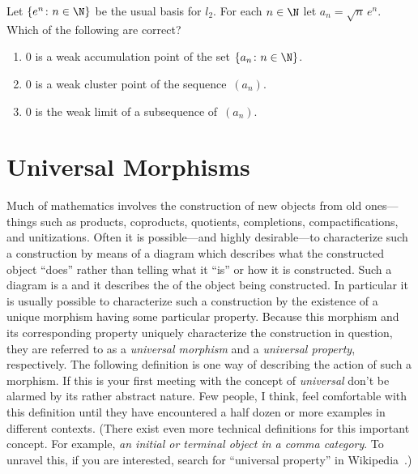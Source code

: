 \begin{exer} Let $\{e^n\colon n \in \N\}$ be the usual basis for $l_2$. For
each $n \in \N$ let $a_n = \sqrt n\, e^n$.  Which of the following
are correct?
 \begin{enumerate}
  \item $0$ is a weak accumulation point of the set
$\{a_n\colon n \in \N\}$.
  \item $0$ is a weak cluster point of the sequence~$(a_n)$.
  \item $0$ is the weak limit of a subsequence of~$(a_n)$.
 \end{enumerate}
\end{exer}










\section{Universal Morphisms}
Much of mathematics involves the construction of new objects from old ones---things such
as products, coproducts, quotients, completions, compactifications, and unitizations.
Often it is possible---and highly desirable---to characterize such a construction by
means of a diagram which describes what the constructed object ``does'' rather than
telling what it ``is'' or how it is constructed.  Such a diagram is a
 and it describes the
 of the object being constructed.
In particular it is usually possible to characterize such a construction by the existence
of a unique morphism having some particular property. Because this morphism and its
corresponding property uniquely characterize the construction in question, they are referred to as a
\emph{universal morphism} and a \emph{universal property}, respectively. The following definition
is one way of describing the action of such a morphism.  If this is your first meeting with the
concept of \emph{universal} don't be alarmed by its rather abstract nature.  Few people, I think,
feel comfortable with this definition until they have encountered a half dozen or more examples in
different contexts.  (There exist even more technical definitions for this important concept. For
example, \emph{an initial or terminal object in a comma category}. To unravel this, if you are
interested, search for ``universal property'' in Wikipedia~\cite{wiki:xxx}.)

